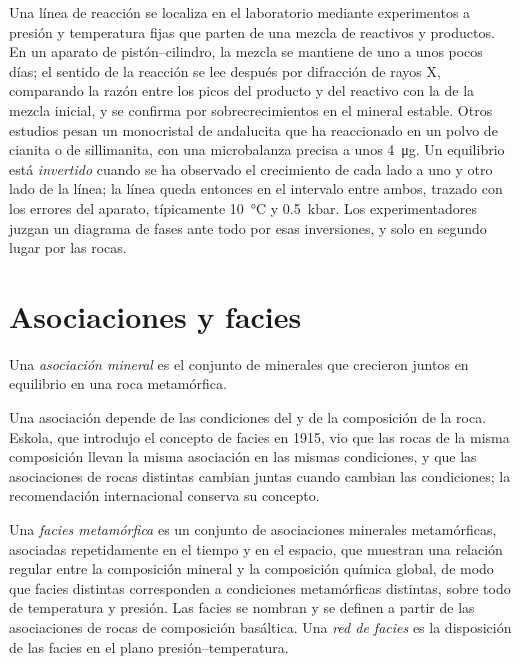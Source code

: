 \begin{inthelab}
Una línea de reacción se localiza en el laboratorio mediante experimentos a presión y
temperatura fijas que parten de una mezcla de reactivos y productos. En un aparato de
pistón--cilindro, la mezcla se mantiene de uno a unos pocos días; el sentido de la reacción se
lee después por difracción de rayos X, comparando la razón entre los picos del producto y del reactivo
con la de la mezcla inicial, y se confirma por sobrecrecimientos en el mineral estable. Otros
estudios pesan un monocristal de andalucita que ha reaccionado en un polvo de cianita o de
sillimanita, con una microbalanza precisa a unos \qty{4}{\micro g}. Un equilibrio está
\emph{invertido} cuando se ha observado el crecimiento de cada lado a uno y otro lado de la línea;
la línea queda entonces en el intervalo entre ambos, trazado con los errores del aparato,
típicamente \qty{10}{\celsius} y \qty{0.5}{kbar}. Los experimentadores juzgan un diagrama de fases ante todo
por esas inversiones, y solo en segundo lugar por las rocas.
\end{inthelab}

\section{Asociaciones y facies}\label{sec:b2:metamorphic-facies:facies}

\begin{definition}\label{def:b2:metamorphic-facies:assemblage}
Una \emph{asociación mineral} es el conjunto de minerales que crecieron
juntos en equilibrio en una roca metamórfica.
\end{definition}

Una asociación depende de las condiciones del  y de la composición de la
roca. Eskola, que introdujo el concepto de facies en 1915, vio que las rocas de la misma
composición llevan la misma asociación en las mismas condiciones, y que las
asociaciones de rocas distintas cambian juntas cuando cambian las condiciones; la
recomendación internacional conserva su concepto.

\begin{definition}\label{def:b2:metamorphic-facies:facies}
Una \emph{facies metamórfica} es un conjunto de asociaciones minerales
metamórficas, asociadas repetidamente en el tiempo y en el espacio, que muestran una relación regular
entre la composición mineral y la composición química global, de modo que facies distintas
corresponden a condiciones metamórficas distintas, sobre todo de temperatura y presión. Las
facies se nombran y se definen a partir de las asociaciones de rocas de composición basáltica. Una
\emph{red de facies} es la disposición de las facies en el
plano presión--temperatura.
\end{definition}

